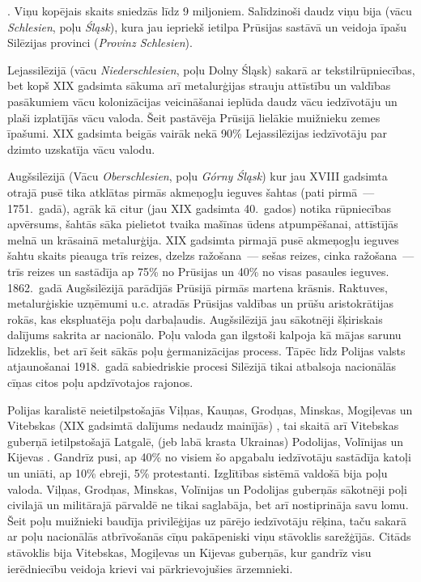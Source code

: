 \documentclass[twoside,a5paper,12pt,fleqn,openany]{extbook}
\newcommand{\asterism}{\vspace{1em}{\centering\Large\bfseries$\ast~\ast~\ast$\par}\vspace{1em}}
\newcommand{\pltxti}[1]{\textit{\textpolish{#1}}}
\newcommand{\detxti}[1]{\textit{\textgerman{#1}}}
\begin{document}
\asterism

. Viņu kopējais skaits sniedzās līdz 9 miljoniem. Salīdzinoši daudz viņu bija  (vācu \detxti{Schlesien}, poļu \pltxti{Śląsk}), kura jau iepriekš ietilpa Prūsijas sastāvā un veidoja īpašu Silēzijas provinci (\detxti{Provinz Schlesien}).

Lejassilēzijā (vācu \detxti{Niederschlesien}, poļu Dolny Śląsk) sakarā ar tekstilrūpniecības, bet kopš XIX gadsimta sākuma arī metalurģijas strauju attīstību un valdības pasākumiem vācu kolonizācijas veicināšanai ieplūda daudz vācu iedzīvotāju un plaši izplatījās vācu valoda. Šeit pastāvēja Prūsijā lielākie muižnieku zemes īpašumi. XIX gadsimta beigās vairāk nekā 90\% Lejassilēzijas iedzīvotāju par dzimto uzskatīja vācu valodu.

Augšsilēzijā (Vācu \detxti{Oberschlesien}, poļu \pltxti{Górny Śląsk}) kur jau XVIII gadsimta otrajā pusē tika atklātas pirmās akmeņogļu ieguves šahtas (pati pirmā~--- 1751.~gadā), agrāk kā citur (jau XIX gadsimta 40.~gados) notika rūpniecības apvērsums, šahtās sāka pielietot tvaika mašīnas ūdens atpumpēšanai, attīstījās melnā un krāsainā metalurģija. XIX gadsimta pirmajā pusē akmeņogļu ieguves šahtu skaits pieauga trīs reizes, dzelzs ražošana~--- sešas reizes, cinka ražošana~--- trīs reizes un sastādīja ap 75\% no Prūsijas un 40\% no visas pasaules ieguves. 1862.~gadā Augšsilēzijā parādījās Prūsijā pirmās martena krāsnis. Raktuves, metalurģiskie uzņēmumi u.c. atradās Prūsijas valdības un prūšu aristokrātijas rokās, kas ekspluatēja poļu darbaļaudis. Augšsilēzijā jau sākotnēji šķiriskais dalījums sakrita ar nacionālo. Poļu valoda gan ilgstoši kalpoja kā mājas sarunu līdzeklis, bet arī šeit sākās poļu ģermanizācijas process. Tāpēc līdz Polijas valsts atjaunošanai 1918.~gadā sabiedriskie procesi Silēzijā tikai atbalsoja nacionālās cīņas citos poļu apdzīvotajos rajonos.

 Polijas karalistē neietilpstošajās  Viļņas, Kauņas, Grodņas, Minskas, Mogiļevas un Vitebskas (XIX gadsimtā dalījums nedaudz mainījās) , tai skaitā arī Vitebskas guberņā ietilpstošajā Latgalē,  (jeb labā krasta Ukrainas) Podolijas, Volīnijas un Kijevas . Gandrīz pusi, ap 40\% no visiem šo apgabalu iedzīvotāju sastādīja katoļi un uniāti, ap 10\% ebreji, 5\% protestanti. Izglītības sistēmā valdošā bija poļu valoda. Viļņas, Grodņas, Minskas, Volīnijas un Podolijas guberņās sākotnēji poļi civilajā un militārajā pārvaldē ne tikai saglabāja, bet arī nostiprināja savu lomu. Šeit poļu muižnieki baudīja privilēģijas uz pārējo iedzīvotāju rēķina, taču sakarā ar poļu nacionālās atbrīvošanās cīņu pakāpeniski viņu stāvoklis sarežģījās. Citāds stāvoklis bija Vitebskas, Mogiļevas un Kijevas guberņās, kur gandrīz visu ierēdniecību veidoja krievi vai pārkrievojušies ārzemnieki.
\end{document}
